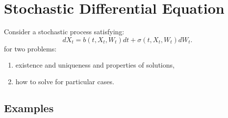 \chapter{Stochastic Differential Equation}

Consider a stochastic process satisfying:
\begin{equation*}
    dX_t = b(t,X_t,W_t)dt + \sigma(t,X_t,W_t)dW_t \tag{$*$}.
\end{equation*}
for two problems:
\begin{enumerate}[label=(\arabic{*})]
    \item existence and uniqueness and properties of solutions,
    \item how to solve for particular cases.
\end{enumerate}

\section{Examples}


